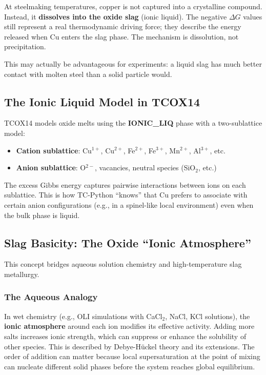 \documentclass[11pt]{article}
\begin{document}
\begin{insight}[Cu Capture = Slag Dissolution]
At steelmaking temperatures, copper is not captured into a crystalline compound. Instead, it \textbf{dissolves into the oxide slag} (ionic liquid). The negative $\Delta G$ values still represent a real thermodynamic driving force; they describe the energy released when Cu enters the slag phase. The mechanism is dissolution, not precipitation.

This may actually be advantageous for experiments: a liquid slag has much better contact with molten steel than a solid particle would.
\end{insight}

\subsection{The Ionic Liquid Model in TCOX14}

TCOX14 models oxide melts using the \textbf{IONIC\_LIQ} phase with a two-sublattice model:
\begin{itemize}[leftmargin=*]
    \item \textbf{Cation sublattice}: Cu$^{1+}$, Cu$^{2+}$, Fe$^{2+}$, Fe$^{3+}$, Mn$^{2+}$, Al$^{3+}$, etc.
    \item \textbf{Anion sublattice}: O$^{2-}$, vacancies, neutral species (SiO$_2$, etc.)
\end{itemize}

The excess Gibbs energy captures pairwise interactions between ions on each sublattice. This is how TC-Python ``knows'' that Cu prefers to associate with certain anion configurations (e.g., in a spinel-like local environment) even when the bulk phase is liquid.

\subsection{Slag Basicity: The Oxide ``Ionic Atmosphere''}
\label{sec:ionic_atmosphere}

This concept bridges aqueous solution chemistry and high-temperature slag metallurgy.

\subsubsection{The Aqueous Analogy}

In wet chemistry (e.g., OLI simulations with CaCl$_2$, NaCl, KCl solutions), the \textbf{ionic atmosphere} around each ion modifies its effective activity. Adding more salts increases ionic strength, which can suppress or enhance the solubility of other species. This is described by Debye-H\"uckel theory and its extensions. The order of addition can matter because local supersaturation at the point of mixing can nucleate different solid phases before the system reaches global equilibrium.
\end{document}
